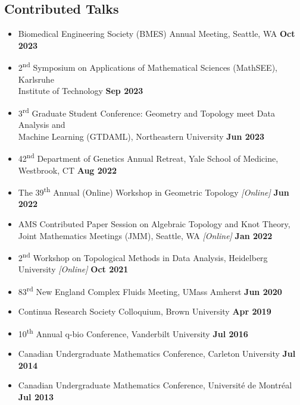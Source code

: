 \documentclass[margin,line]{res}
\begin{document}
\begin{resume}
\section{\sc Contributed Talks}
{\renewcommand\leftmargini{0em}
\begin{itemize}
\setlength\itemsep{0.3em}
\item[] Biomedical Engineering Society (BMES) Annual Meeting, Seattle, WA \hfill {\bf Oct 2023}
\item[] 2\textsuperscript{nd} Symposium on Applications of Mathematical Sciences (MathSEE), Karlsruhe \\ Institute of Technology \hfill {\bf Sep 2023}
\item[] 3\textsuperscript{rd} Graduate Student Conference: Geometry and Topology meet Data Analysis and \\Machine Learning (GTDAML), Northeastern University \hfill {\bf Jun 2023}
\item[] 42\textsuperscript{nd} Department of Genetics Annual Retreat, Yale School of Medicine, Westbrook, CT \hfill {\bf Aug 2022}
\item[] The 39\textsuperscript{th} Annual (Online) Workshop in Geometric Topology \textit{[Online]} \hfill {\bf Jun 2022}
\item[] AMS Contributed Paper Session on Algebraic Topology and Knot Theory, \\Joint Mathematics Meetings (JMM), Seattle, WA \textit{[Online]} \hfill {\bf Jan 2022}
\item[] 2\textsuperscript{nd} Workshop on Topological Methods in Data Analysis, Heidelberg University \textit{[Online]} \hfill {\bf Oct 2021}
\item[] 83\textsuperscript{rd} New England Complex Fluids Meeting, UMass Amherst \hfill {\bf Jun 2020}
\item[] Continua Research Society Colloquium, Brown University \hfill {\bf Apr 2019}
\item[] 10\textsuperscript{th} Annual q-bio Conference, Vanderbilt University \hfill {\bf Jul 2016}
\item[] Canadian Undergraduate Mathematics Conference, Carleton University \hfill {\bf Jul 2014}
\item[] Canadian Undergraduate Mathematics Conference, Universit\'e de Montr\'eal \hfill {\bf Jul 2013}
\end{itemize}
}


\end{resume}
\end{document}
